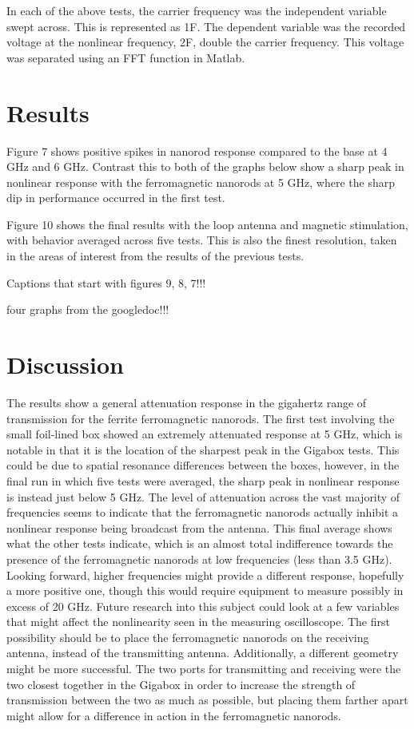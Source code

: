 In each of the above tests, the carrier frequency was the independent variable swept across. This is represented as 1F. The dependent variable was the recorded voltage at the nonlinear frequency, 2F, double the carrier frequency. This voltage was separated using an FFT function in Matlab.

\section{Results}
\label{sec:nanorod-results}

Figure 7 shows positive spikes in nanorod response compared to the base at 4 GHz and 6 GHz. Contrast this to both of the graphs below show a sharp peak in nonlinear response with the ferromagnetic nanorods at 5 GHz, where the sharp dip in performance occurred in the first test.

Figure 10 shows the final results with the loop antenna and magnetic stimulation, with behavior averaged across five tests. This is also the finest resolution, taken in the areas of interest from the results of the previous tests.

{Captions that start with figures 9, 8, 7!!!}

{four graphs from the googledoc!!!}


\section{Discussion}
\label{sec:nanorod-discussion}

The results show a general attenuation response in the gigahertz range of transmission for the ferrite ferromagnetic nanorods. The first test involving the small foil-lined box showed an extremely attenuated response at 5 GHz, which is notable in that it is the location of the sharpest peak in the Gigabox tests. This could be due to spatial resonance differences between the boxes, however, in the final run in which five tests were averaged, the sharp peak in nonlinear response is instead just below 5 GHz. The level of attenuation across the vast majority of frequencies seems to indicate that the ferromagnetic nanorods actually inhibit a nonlinear response being broadcast from the antenna. This final average shows what the other tests indicate, which is an almost total indifference towards the presence of the ferromagnetic nanorods at low frequencies (less than 3.5 GHz). Looking forward, higher frequencies might provide a different response, hopefully a more positive one, though this would require equipment to measure possibly in excess of 20 GHz.
Future research into this subject could look at a few variables that might affect the nonlinearity seen in the measuring oscilloscope. The first possibility should be to place the ferromagnetic nanorods on the receiving antenna, instead of the transmitting antenna. Additionally, a different geometry might be more successful. The two ports for transmitting and receiving were the two closest together in the Gigabox in order to increase the strength of transmission between the two as much as possible, but placing them farther apart might allow for a difference in action in the ferromagnetic nanorods.

